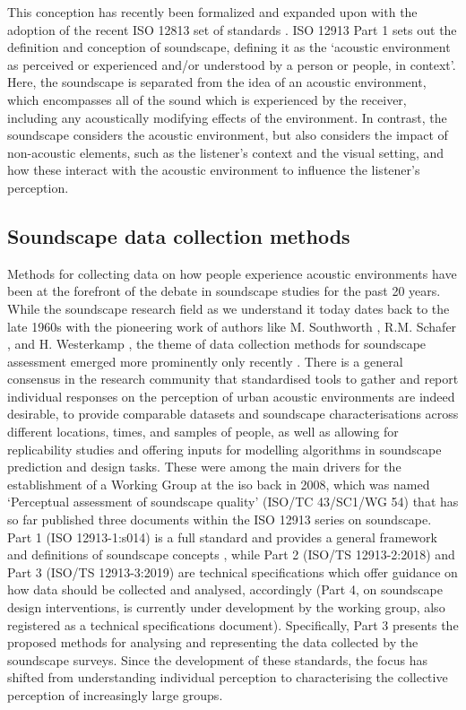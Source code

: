 This conception has recently been formalized and expanded upon with the adoption of the recent ISO 12813 set of standards \citep{ISO12913Part1, ISO12913Part2,ISO12913Part3}. ISO 12913 Part 1 sets out the definition and conception of soundscape, defining it as the `acoustic environment as perceived or experienced and/or understood by a person or people, in context'. Here, the soundscape is separated from the idea of an acoustic environment, which encompasses all of the sound which is experienced by the receiver, including any acoustically modifying effects of the environment. In contrast, the soundscape considers the acoustic environment, but also considers the impact of non-acoustic elements, such as the listener's context and the visual setting, and how these interact with the acoustic environment to influence the listener's perception.


\subsection{Soundscape data collection methods}
Methods for collecting data on how people experience acoustic environments have been at the forefront of the debate in soundscape studies for the past 20 years. While the soundscape research field as we understand it today dates back to the late 1960s with the pioneering work of authors like M. Southworth \citep{Southworth1969sonic}, R.M. Schafer \citep{SoundscapeOursonicSchafer}, and H. Westerkamp \citep{Westerkamp2002Linking}, the theme of data collection methods for soundscape assessment emerged more prominently only recently \citep{Kang2016Ten}. There is a general consensus in the research community that standardised tools to gather and report individual responses on the perception of urban acoustic environments are indeed desirable, to provide comparable datasets and soundscape characterisations across different locations, times, and samples of people, as well as allowing for replicability studies and offering inputs for modelling algorithms in soundscape prediction and design tasks. These were among the main drivers for the establishment of a Working Group at the \gls{iso} back in 2008, which was named `Perceptual assessment of soundscape quality' (ISO/TC 43/SC1/WG 54) that has so far published three documents within the ISO 12913 series on soundscape. Part 1 (ISO 12913-1:s014) is a full standard and provides a general framework and definitions of soundscape concepts \citep{ISO12913Part1}, while Part 2 (ISO/TS 12913-2:2018) and Part 3 (ISO/TS 12913-3:2019) are technical specifications which offer guidance on how data should be collected and analysed, accordingly \citep{ISO12913Part2,ISO12913Part3} (Part 4, on soundscape design interventions, is currently under development by the working group, also registered as a technical specifications document). Specifically, Part 3 presents the proposed methods for analysing and representing the data collected by the soundscape surveys. Since the development of these standards, the focus has shifted from understanding individual perception to characterising the collective perception of increasingly large groups.

